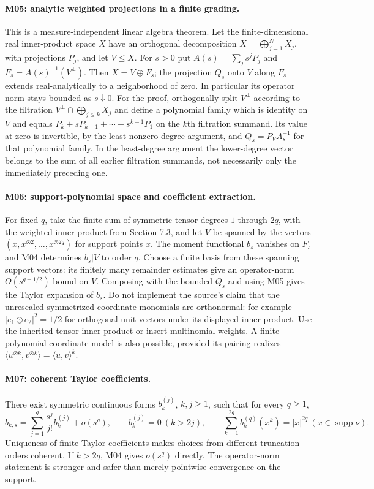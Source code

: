 \paragraph{M05: analytic weighted projections in a finite grading.}
This is a measure-independent linear algebra theorem. Let the finite-dimensional
real inner-product space $X$ have an orthogonal decomposition
$X=\bigoplus_{j=1}^{N}X_j$, with projections $P_j$, and let $V\leq X$.
For $s>0$ put $A(s)=\sum_j s^jP_j$ and
$F_s=A(s)^{-1}(V^\perp)$. Then $X=V\oplus F_s$; the projection $Q_s$
onto $V$ along $F_s$ extends real-analytically to a neighborhood of zero.
In particular its operator norm stays bounded as $s\downarrow0$.
For the proof, orthogonally split $V^\perp$ according to the filtration
$V^\perp\cap\bigoplus_{j\leq k}X_j$ and define a polynomial family which
is identity on $V$ and equals $P_k+sP_{k-1}+\cdots+s^{k-1}P_1$ on the
$k$th filtration summand. Its value at zero is invertible, by the
least-nonzero-degree argument, and $Q_s=P_V A_s^{-1}$ for that polynomial
family. In the least-degree argument the lower-degree vector belongs to the
sum of all earlier filtration summands, not necessarily only the immediately
preceding one.

\paragraph{M06: support-polynomial space and coefficient extraction.}
For fixed $q$, take the finite sum of symmetric tensor degrees $1$ through
$2q$, with the weighted inner product from Section 7.3, and let $V$ be spanned
by the vectors $(x,x^{\otimes2},\ldots,x^{\otimes2q})$ for support points $x$.
The moment functional $b_s$ vanishes on $F_s$ and M04 determines
$b_s|V$ to order $q$. Choose a finite basis from these spanning support vectors:
its finitely many remainder estimates give an operator-norm
$O(s^{q+1/2})$ bound on $V$. Composing with the bounded $Q_s$ and using M05
gives the Taylor expansion of $b_s$.
Do not implement the source's claim that the unrescaled symmetrized coordinate
monomials are orthonormal: for example
$|e_1\odot e_2|^2=1/2$ for orthogonal unit vectors under its displayed inner
product. Use the inherited tensor inner product or insert multinomial weights.
A finite polynomial-coordinate model is also possible, provided its pairing
realizes $\langle u^{\otimes k},v^{\otimes k}\rangle=\langle u,v\rangle^k$.

\paragraph{M07: coherent Taylor coefficients.}
There exist symmetric continuous forms $b_k^{(j)}$, $k,j\geq1$, such that for
every $q\geq1$,
\[
 b_{k,s}=\sum_{j=1}^{q}\frac{s^j}{j!}b_k^{(j)}+o(s^q),\qquad
 b_k^{(j)}=0\ (k>2j),\qquad
 \sum_{k=1}^{2q}b_k^{(q)}(x^k)=|x|^{2q}\ (x\in\operatorname{supp}\nu).
\]
Uniqueness of finite Taylor coefficients makes choices from different truncation
orders coherent. If $k>2q$, M04 gives $o(s^q)$ directly. The operator-norm
statement is stronger and safer than merely pointwise convergence on the support.

